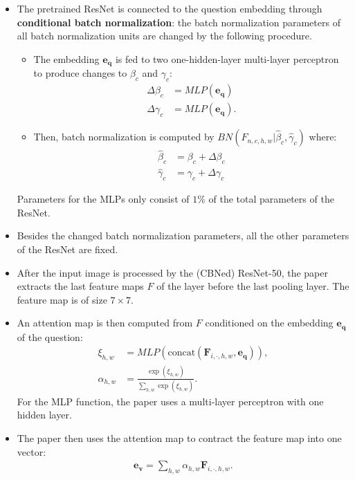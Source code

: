 \documentclass[10pt]{article}
\newcommand{\ve}[1]{\mathbf{#1}}
\begin{document}
\begin{itemize}
  	\item The pretrained ResNet is connected to the question embedding through \textbf{conditional batch normalization}: the batch normalization parameters of all batch normalization units are changed by the following procedure.
  	\begin{itemize}
  		\item The embedding $\ve{e}_{\ve{q}}$ is fed to two one-hidden-layer multi-layer perceptron to produce changes to $\beta_c$ and $\gamma_c$:
  		\begin{align*}
  			\Delta \beta_c &= MLP(\ve{e}_{\ve{q}}) \\
  			\Delta \gamma_c &= MLP(\ve{e}_{\ve{q}}).
  		\end{align*}

  		\item Then, batch normalization is computed by $BN(F_{n,c,h,w}|\hat\beta_c, \hat\gamma_c)$ where:
  		\begin{align*}
  			\hat\beta_c &= \beta_c + \Delta\beta_c \\
  			\hat\gamma_c &= \gamma_c + \Delta\gamma_c
  		\end{align*}
  	\end{itemize}
    Parameters for the MLPs only consist of $1\%$ of the total parameters of the ResNet. 

    \item Besides the changed batch normalization parameters, all the other parameters of the ResNet are fixed.

    \item After the input image is processed by the (CBNed) ResNet-50, the paper extracts the last feature maps $F$ of the layer before the last pooling layer. The feature map is of size $7\times 7$.

    \item An attention map is then computed from $F$ conditioned on the embedding $\ve{e}_{\ve{q}}$ of the question:
    \begin{align*}
      \xi_{h,w} &= MLP(\mathrm{concat}(\ve{F}_{i,\cdot,h,w}, \ve{e}_{\ve{q}})), \\
      \alpha_{h,w} &= \frac{\exp(\xi_{h,w})}{\sum_{h,w} \exp(\xi_{h,w})}.
    \end{align*}
    For the MLP function, the paper uses a multi-layer perceptron with one hidden layer.

    \item The paper then uses the attention map to contract the feature map into one vector:
    \begin{align*}
      \ve{e}_{\ve{v}} = \sum_{h,w} \alpha_{h,w} \ve{F}_{i,\cdot,h,w}.
    \end{align*}


\end{itemize}
\end{document}
